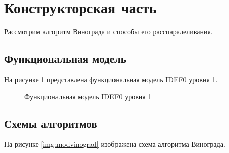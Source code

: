 \documentclass[a4paper,12pt]{article}
\begin{document}
\newpage
\section{Конструкторская часть}

Рассмотрим алгоритм Винограда и способы его расспаралеливания.

\subsection{Функциональная модель}

На рисунке \ref{img:idef0} представлена функциональная модель IDEF0 уровня 1.

\begin{figure}[H]
    \caption{Функциональная модель IDEF0 уровня 1}
    \label{img:idef0}
\end{figure}

\subsection{Схемы алгоритмов}

На рисунке \ref{img:modvinograd} изображена схема
алгоритма Винограда.
\end{document}

